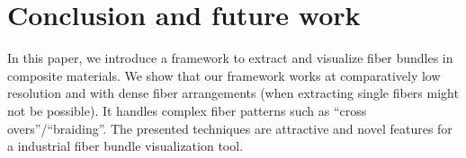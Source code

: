 





\section{Conclusion and future work}
In this paper, we introduce a framework to extract and visualize fiber bundles in composite materials. We show that our framework works at comparatively low resolution and with dense fiber arrangements (when extracting single fibers might not be possible). It handles complex fiber patterns such as ``cross overs''/``braiding''. The presented techniques are attractive and novel features for a industrial fiber bundle visualization tool.


%
